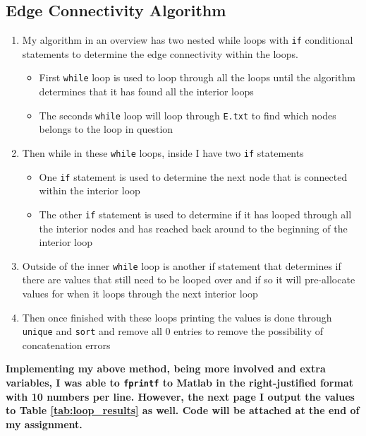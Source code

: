 \begin{adjustwidth}{2.5em}{0pt}

    \subsection*{Edge Connectivity Algorithm}
    \begin{enumerate}
        \item My algorithm in an overview has two nested while loops with {\tt{if}} conditional statements to determine the edge connectivity within the loops.
        \begin{itemize}
            \item First {\tt while} loop is used to loop through all the loops until the algorithm determines that it has found all the interior loops
            \item The seconds {\tt while} loop will loop through {\tt E.txt} to find which nodes belongs to the loop in question
        \end{itemize}
        \item Then while in these {\tt while} loops, inside I have two {\tt if} statements
        \begin{itemize}
            \item One {\tt if} statement is used to determine the next node that is connected within the interior loop
            \item The other {\tt if} statement is used to determine if it has looped through all the interior nodes and has reached back around to the beginning of the interior loop
        \end{itemize}
        \item Outside of the inner {\tt while} loop is another if statement that determines if there are values that still need to be looped over and if so it will pre-allocate values for when it loops through the next interior loop
        \item Then once finished with these loops printing the values is done through {\tt unique} and {\tt sort} and remove all 0 entries to remove the possibility of concatenation errors
    \end{enumerate}

    \begin{fminipage}{0.8\linewidth}
        \textbf{Implementing my above method, being more involved and extra variables, I was able to {\tt fprintf} to Matlab in the right-justified format with 10 numbers per line. However, the next page I output the values to Table \ref{tab:loop_results} as well. Code will be attached at the end of my assignment.}
    \end{fminipage}
\end{adjustwidth}


